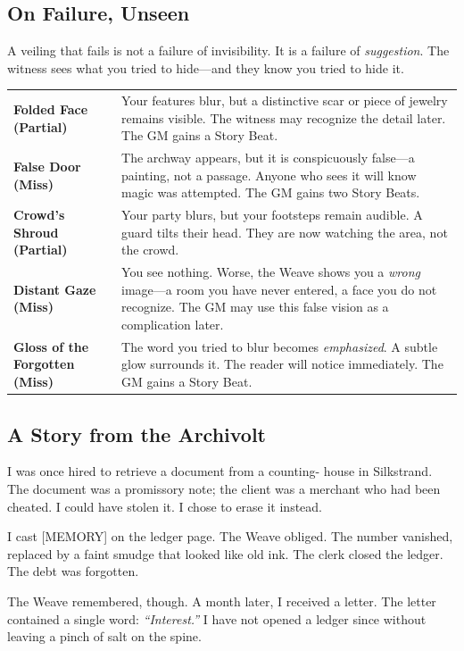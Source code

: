 \subsection{On Failure, Unseen}

A veiling that fails is not a failure of invisibility. It is a failure of \emph{suggestion}. The witness sees what you tried to hide---and they know you tried to hide it.

\begin{tabular}{p{} p{}}
\textbf{Folded Face (Partial)} & Your features blur, but a distinctive scar or piece of jewelry remains visible. The witness may recognize the detail later. The GM gains a Story Beat. \\
\textbf{False Door (Miss)} & The archway appears, but it is conspicuously false---a painting, not a passage. Anyone who sees it will know magic was attempted. The GM gains two Story Beats. \\
\textbf{Crowd's Shroud (Partial)} & Your party blurs, but your footsteps remain audible. A guard tilts their head. They are now watching the area, not the crowd. \\
\textbf{Distant Gaze (Miss)} & You see nothing. Worse, the Weave shows you a \emph{wrong} image---a room you have never entered, a face you do not recognize. The GM may use this false vision as a complication later. \\
\textbf{Gloss of the Forgotten (Miss)} & The word you tried to blur becomes \emph{emphasized}. A subtle glow surrounds it. The reader will notice immediately. The GM gains a Story Beat. \\
\end{tabular}

\subsection{A Story from the Archivolt}

I was once hired to retrieve a document from a counting- house in Silkstrand. The document was a promissory note; the client was a merchant who had been cheated. I could have stolen it. I chose to erase it instead.

I cast [MEMORY] on the ledger page. The Weave obliged. The number vanished, replaced by a faint smudge that looked like old ink. The clerk closed the ledger. The debt was forgotten.

The Weave remembered, though. A month later, I received a letter. The letter contained a single word: \emph{``Interest.''} I have not opened a ledger since without leaving a pinch of salt on the spine.


